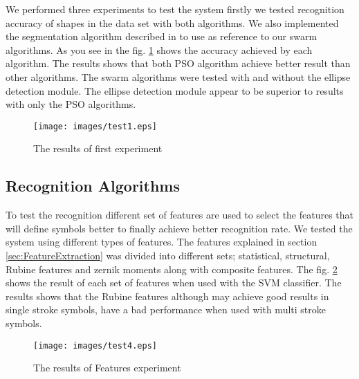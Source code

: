 We performed three experiments to test the system firstly we tested recognition accuracy of shapes in the data set with both algorithms. We also implemented the segmentation algorithm described in \cite{earlyprocess} to use as reference to our swarm algorithms.  As you see in the fig. \ref{fig:test1} shows the accuracy achieved by each algorithm. The results shows that both PSO algorithm achieve better result than other algorithms.  The swarm algorithms were tested with and without the ellipse detection module. The ellipse detection module appear to be superior to results with only the PSO algorithms.  \\  
\begin{figure}[]
	\centering
		\texttt{[image: images/test1.eps]}
	\caption{The results of first experiment}
	\label{fig:test1}
\end{figure}
 

\subsection {Recognition Algorithms }
\label{sec:recognitionAlgorithms}
To test the recognition different set of features are used to select the features that will define symbols better to finally achieve better recognition rate. We tested the system using different types of features. The features explained in section \ref{sec:FeatureExtraction} was divided into different sets; statistical, structural, Rubine features and zernik moments along with composite features. The fig. \ref{fig:testFeatures} shows the result of each set of features when used with the SVM classifier. The results shows that the Rubine features although may achieve good results in single stroke symbols, have a bad performance when used with multi stroke symbols. 
\begin{figure}[]
	\centering
		\texttt{[image: images/test4.eps]}
	\caption{The results of Features experiment}
	\label{fig:testFeatures}
\end{figure}



